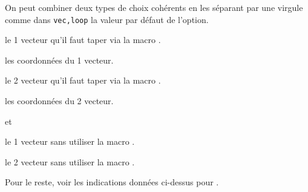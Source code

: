 \documentclass[12pt,a4paper]{article}
\begin{document}
            On peut combiner deux types de choix cohérents en les séparant par une virgule comme dans \verb+vec,loop+ la valeur par défaut de l'option.
            
            
 le 1\ier{} vecteur qu'il faut taper via la macro .

 les coordonnées du 1\ier{} vecteur.

 le 2\ieme{} vecteur qu'il faut taper via la macro .

 les coordonnées du 2\ieme{} vecteur.


\separation


  \hfill {}
                                    et 

 le 1\ier{} vecteur sans utiliser la macro .

 le 2\ieme{} vecteur sans utiliser la macro .

\medskip

Pour le reste, voir les indications données ci-dessus pour . 
\end{document}

